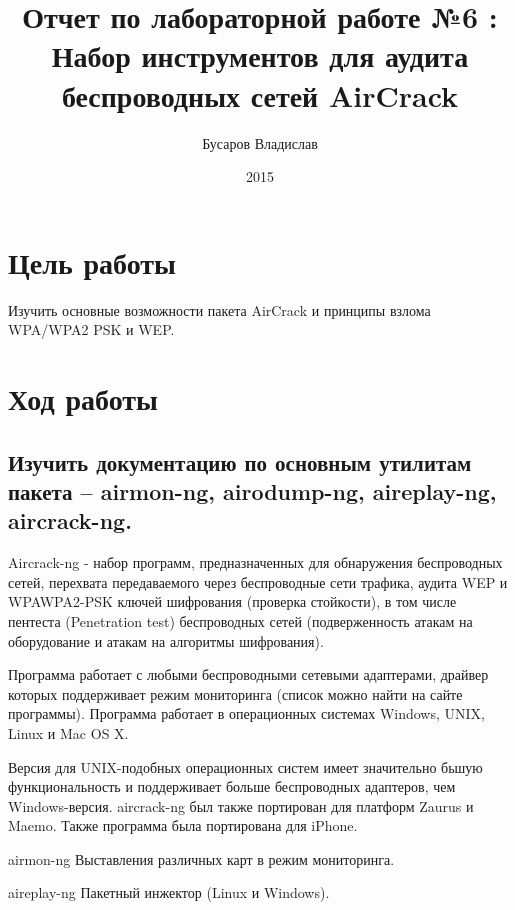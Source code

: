 \documentclass[11pt, a4paper]{article}		%
\author{Бусаров Владислав}
\title{Отчет по лабораторной работе №6 :\\ Набор инструментов для аудита беспроводных сетей AirCrack}
\date{2015}
\begin{document}
\maketitle
\tableofcontents
\newpage



\section{Цель работы}

Изучить основные возможности пакета AirCrack и принципы взлома WPA/WPA2 PSK и WEP.




\section{Ход работы}



\subsection{Изучить документацию по основным утилитам пакета – airmon-ng, airodump-ng, aireplay-ng, aircrack-ng.}

Aircrack-ng - набор программ, предназначенных для обнаружения беспроводных сетей, перехвата передаваемого через беспроводные сети трафика, аудита WEP и WPAWPA2-PSK ключей шифрования (проверка стойкости), в том числе пентеста (Penetration test) беспроводных сетей (подверженность атакам на оборудование и атакам на алгоритмы шифрования).

Программа работает с любыми беспроводными сетевыми адаптерами, драйвер которых поддерживает режим мониторинга (список можно найти на сайте программы). Программа работает в операционных системах Windows, UNIX, Linux и Mac OS X. 

Версия для UNIX-подобных операционных систем имеет значительно бьшую функциональность и поддерживает больше беспроводных адаптеров, чем Windows-версия. aircrack-ng был также портирован для платформ Zaurus и Maemo. Также программа была портирована для iPhone.

airmon-ng	Выставления различных карт в режим мониторинга.

aireplay-ng	Пакетный инжектор (Linux и Windows).
\end{document}
